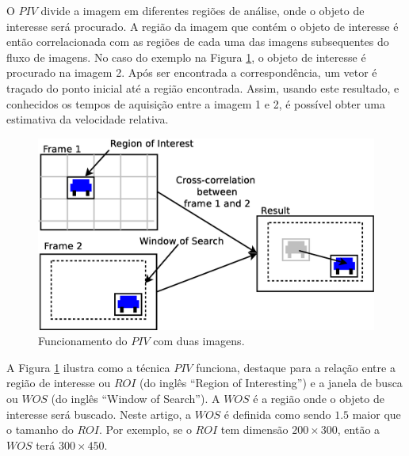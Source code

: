 O $PIV$ divide a imagem em diferentes regiões de análise, onde o objeto de interesse será procurado. 
A região da imagem que contém o objeto de interesse é então correlacionada 
com as regiões de cada uma das imagens subsequentes do fluxo de imagens. No caso do exemplo na 
Figura \ref{fig:twoframes}, o objeto de interesse é procurado na imagem 2. 
Após ser encontrada a correspondência, um vetor é traçado do ponto inicial
até a região encontrada. Assim,  usando este resultado,
e conhecidos os tempos de aquisição entre a imagem 1 e 2,
é possível obter uma  estimativa da velocidade relativa.
\begin{figure}[H]
\centering
\includegraphics[width=0.9\columnwidth]{images/explanationPIV.eps}
\caption{Funcionamento do $PIV$ com duas imagens.}
\label{fig:twoframes}
\end{figure}

A Figura \ref{fig:twoframes} ilustra como a técnica $PIV$ funciona, 
destaque para a relação entre a região de interesse ou $ROI$ (do inglês ``Region of Interesting'') e 
a janela de busca ou $WOS$  (do inglês ``Window of Search''). 
A $WOS$ é a região onde o objeto de interesse será buscado.
Neste artigo, a $WOS$ é definida como sendo $1.5$ maior que o tamanho do $ROI$. 
Por exemplo, se o $ROI$ tem dimensão $200\times300$, então a $WOS$ terá $300\times450$.


